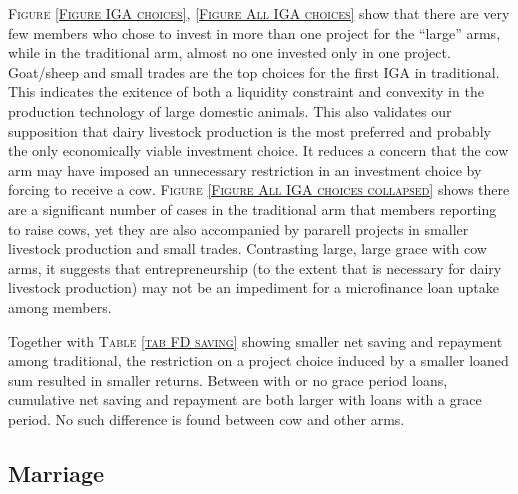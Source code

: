 \begin{palepinkleftbar}
\begin{finding}
\textsc{\small Figure \ref{Figure IGA choices}, \ref{Figure All IGA choices}} show that there are very few members who chose to invest in more than one project for the ``large'' arms, while in the \textsf{traditional} arm, almost no one invested only in one project. Goat/sheep and small trades are the top choices for the first IGA in \textsf{traditional}. This indicates the exitence of both a liquidity constraint and convexity in the production technology of large domestic animals. This also validates our supposition that dairy livestock production is the most preferred and probably the only economically viable investment choice. It reduces a concern that the \textsf{cow} arm may have imposed an unnecessary restriction in an investment choice by forcing to receive a cow. \textsc{\small Figure \ref{Figure All IGA choices collapsed}} shows there are a significant number of cases in the \textsf{traditional} arm that members reporting to raise cows, yet they are also accompanied by pararell projects in smaller livestock production and small trades. Contrasting \textsf{large}, \textsf{large grace} with \textsf{cow} arms, it suggests that entrepreneurship (to the extent that is necessary for dairy livestock production) may not be an impediment for a microfinance loan uptake among members.
\end{finding}
\end{palepinkleftbar}

Together with \textsc{\small Table \ref{tab FD saving}} showing smaller net saving and repayment among \textsf{traditional}, the restriction on a project choice induced by a smaller loaned sum resulted in smaller returns. Between with or no grace period loans, cumulative net saving and repayment are both larger with loans with a grace period. No such difference is found between \textsf{cow} and other arms.

\subsection{Marriage}

